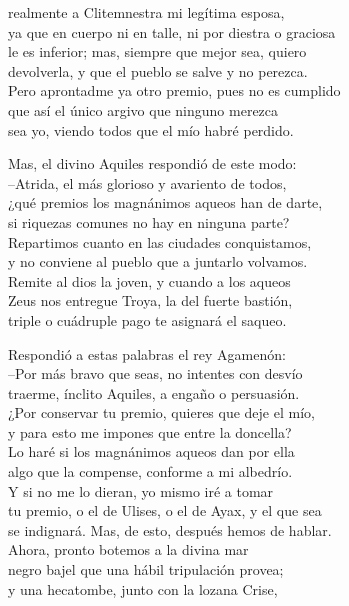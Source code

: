 realmente a Clitemnestra mi legítima esposa,\\
ya que en cuerpo ni en talle, ni por diestra o graciosa\\
le es inferior; mas, siempre que mejor sea, quiero\\
devolverla, y que el pueblo se salve y no perezca.\\
Pero aprontadme ya otro premio, pues no es cumplido\\
que así el único argivo que ninguno merezca\\
sea yo, viendo todos que el mío habré perdido.\par
Mas, el divino Aquiles respondió de este modo:\\
--Atrida, el más glorioso y avariento de todos,\\
¿qué premios los magnánimos aqueos han de darte,\\
si riquezas comunes no hay en ninguna parte?\\
Repartimos cuanto en las ciudades conquistamos,\\
y no conviene al pueblo que a juntarlo volvamos.\\
Remite al dios la joven, y cuando a los aqueos\\
Zeus nos entregue Troya, la del fuerte bastión,\\
triple o cuádruple pago te asignará el saqueo.\par
Respondió a estas palabras el rey Agamenón:\\
--Por más bravo que seas, no intentes con desvío\\
traerme, ínclito Aquiles, a engaño o persuasión.\\
¿Por conservar tu premio, quieres que deje el mío,\\
y para esto me impones que entre la doncella?\\
Lo haré si los magnánimos aqueos dan por ella\\
algo que la compense, conforme a mi albedrío.\\
Y si no me lo dieran, yo mismo iré a tomar\\
tu premio, o el de Ulises, o el de Ayax, y el que sea\\
se indignará. Mas, de esto, después hemos de hablar.\\
Ahora, pronto botemos a la divina mar\\
negro bajel que una hábil tripulación provea;\\
y una hecatombe, junto con la lozana Crise,\\
